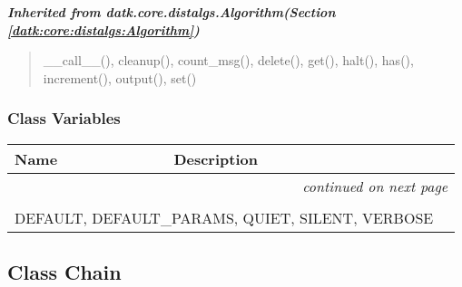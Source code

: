 \large{\textbf{\textit{Inherited from datk.core.distalgs.Algorithm\textit{(Section \ref{datk:core:distalgs:Algorithm})}}}}

\begin{quote}
\_\_call\_\_(), cleanup(), count\_msg(), delete(), get(), halt(), has(), increment(), output(), set()
\end{quote}


  \subsubsection{Class Variables}

    \vspace{-1cm}
\hspace{\varindent}\begin{longtable}{|p{\varnamewidth}|p{\vardescrwidth}|l}
\cline{1-2}
\cline{1-2} \centering \textbf{Name} & \centering \textbf{Description}& \\
\cline{1-2}
\endhead\cline{1-2}\multicolumn{3}{r}{\small\textit{continued on next page}}\\\endfoot\cline{1-2}
\endlastfoot\multicolumn{2}{|l|}{\textit{Inherited from datk.core.distalgs.Algorithm \textit{(Section \ref{datk:core:distalgs:Algorithm})}}}\\
\multicolumn{2}{|p{\varwidth}|}{\raggedright DEFAULT, DEFAULT\_PARAMS, QUIET, SILENT, VERBOSE}\\
\cline{1-2}
\end{longtable}



\subsection{Class Chain}

